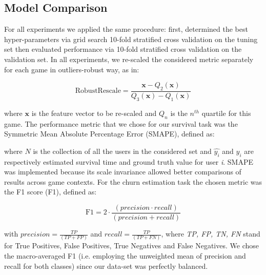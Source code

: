 \subsection{Model Comparison}
For all experiments we applied the same procedure: first, determined the best hyper-parameters via grid search 10-fold stratified cross validation \cite{scikit-learn} on the tuning set then evaluated performance via 10-fold stratified cross validation on the validation set. In all experiments, we re-scaled the considered metric separately for each game in outliers-robust way, as in:

\begin{equation}
\label{robustscaler}
    \text{RobustRescale}=
        \dfrac
            {\mathbf{x} - Q_2(\mathbf{x})}
            {Q_3(\mathbf{x}) - Q_1(\mathbf{x})}
\end{equation}

where $\mathbf{x}$ is the feature vector to be re-scaled and $Q_n$ is the $n^{th}$ quartile for this game. The performance metric that we chose for our survival task was the Symmetric Mean Absolute Percentage Error (SMAPE), defined as:



where $N$ is the collection of all the users in the considered set and $\hat{y_i}$ and $y_i$ are respectively estimated survival time and ground truth value for user \textit{i}. SMAPE was implemented because its scale invariance allowed better comparisons of results across game contexts. For the churn estimation task the chosen metric was the F1 score (F1), defined as:

\begin{equation}
\label{f1}
    \text{F1}=
        2 \cdot 
        \dfrac
            {(precision \cdot recall)}
            {(precision + recall)}
\end{equation}

with $precision =\frac {TP}{(TP + FP)}$ and $recall = \frac {TP}{(TP + FN)}$, where \textit{TP, FP, TN, FN} stand for True Positives, False Positives, True Negatives and False Negatives. We chose the macro-averaged F1 (i.e. employing the unweighted mean of precision and recall for both classes) since our data-set was perfectly balanced.

